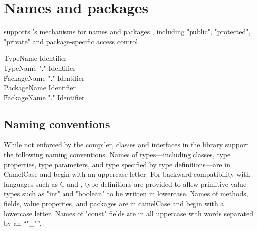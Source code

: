 \chapter{Names and packages}
\label{packages} 

\Xten{} supports \java's mechanisms for names and packages \cite[\S
6,\S 7]{jls2}, including \xcd"public", \xcd"protected", \xcd"private"
and package-specific access control.

\begin{grammar}
TypeName   \: Identifier \\
        \| TypeName \xcd"." Identifier \\
        \| PackageName \xcd"." Identifier \\
PackageName   \: Identifier \\
        \| PackageName \xcd"." Identifier \\
\end{grammar}


\section{Naming conventions}

While not enforced by the compiler, classes and interfaces
in the \Xten{} library support the following naming conventions.
Names of types---including classes, type properties, type
parameters, and type specified by type definitions---are in
CamelCase and begin with an uppercase letter.  For backward
compatibility with languages such as C and \java{}, type
definitions are provided to allow primitive value types
such as \xcd"int" and \xcd"boolean" to be written in lowercase.
Names of methods, fields, value properties, and packages are in camelCase and begin with a lowercase letter.
Names of \xcd"const" fields are in all uppercase with words
separated by an ``\xcd"_"''.


